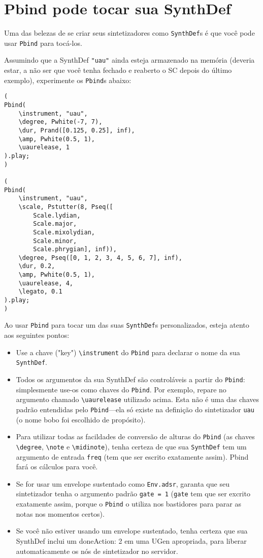 \section{Pbind pode tocar sua SynthDef}

Uma das belezas de se criar seus sintetizadores como \texttt{SynthDef}s é que você pode usar \texttt{Pbind} para tocá-los.

Assumindo que a SynthDef \texttt{"uau"} ainda esteja armazenado na memória (deveria estar, a não ser que você tenha fechado e reaberto o SC depois do último exemplo), experimente os \texttt{Pbind}s abaixo:

\begin{lstlisting}[style=SuperCollider-IDE, basicstyle=\scttfamily\footnotesize]
(
Pbind(
	\instrument, "uau",
	\degree, Pwhite(-7, 7),
	\dur, Prand([0.125, 0.25], inf),
	\amp, Pwhite(0.5, 1),
	\uaurelease, 1
).play;
)

(
Pbind(
	\instrument, "uau",
	\scale, Pstutter(8, Pseq([
		Scale.lydian,
		Scale.major,
		Scale.mixolydian,
		Scale.minor,
		Scale.phrygian], inf)),
	\degree, Pseq([0, 1, 2, 3, 4, 5, 6, 7], inf),
	\dur, 0.2,
	\amp, Pwhite(0.5, 1),
	\uaurelease, 4,
	\legato, 0.1
).play;
)
\end{lstlisting}
 
Ao usar \texttt{Pbind} para tocar um das suas \texttt{SynthDef}s personalizados, esteja atento aos seguintes pontos:

\begin{itemize}
\item Use a chave ("key") \texttt{\textbackslash instrument} do \texttt{Pbind} para declarar o nome da sua \texttt{SynthDef}.
\item Todos os argumentos da sua SynthDef são controláveis a partir do \texttt{Pbind}: simplesmente use-os como chaves do \texttt{Pbind}. Por exemplo, repare no argumento chamado \texttt{\textbackslash uaurelease} utilizado acima. Esta não é uma das chaves padrão entendidas pelo \texttt{Pbind}---ela só existe na definição do sintetizador  \texttt{uau} (o nome bobo foi escolhido de propósito).

\item Para utilizar todas as facildades de conversão de alturas do \texttt{Pbind} (as chaves \texttt{\textbackslash degree}, \texttt{\textbackslash note} e \texttt{\textbackslash midinote}), tenha certeza de que sua \texttt{SynthDef} tem um argumento de entrada \texttt{freq} (tem que ser escrito exatamente assim). Pbind fará os cálculos para você.
\item Se for usar um envelope sustentado como \texttt{Env.adsr}, garanta que seu sintetizador tenha o argumento padrão \texttt{gate = 1} (\texttt{gate} tem que ser excrito exatamente assim, porque o \texttt{Pbind} o utiliza nos bastidores para parar as notas nos momentos certos).
\item Se você não estiver usando um envelope sustentado, tenha certeza que sua SynthDef inclui um doneAction: 2 em uma UGen apropriada, para liberar automaticamente os nós de sintetizador no servidor.
\end{itemize}


